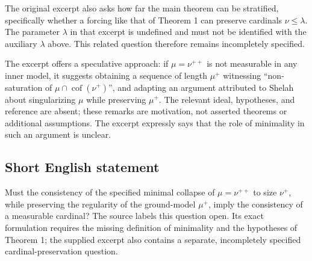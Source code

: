 \documentclass[11pt]{article}
\begin{document}
The original excerpt also asks how far the main theorem can be stratified, specifically whether a forcing like that of Theorem 1 can preserve cardinals \(\nu\leq\lambda\). The parameter \(\lambda\) in that excerpt is undefined and must not be identified with the auxiliary \(\lambda\) above. This related question therefore remains incompletely specified.

The excerpt offers a speculative approach: if \(\mu=\nu^{++}\) is not measurable in any inner model, it suggests obtaining a sequence of length \(\mu^+\) witnessing ``non-saturation of \(\mu\cap\operatorname{cof}(\nu^+)\)'', and adapting an argument attributed to Shelah about singularizing \(\mu\) while preserving \(\mu^+\). The relevant ideal, hypotheses, and reference are absent; these remarks are motivation, not asserted theorems or additional assumptions. The excerpt expressly says that the role of minimality in such an argument is unclear.
\subsection{Short English statement}
Must the consistency of the specified minimal collapse of \(\mu=\nu^{++}\) to size \(\nu^+\), while preserving the regularity of the ground-model \(\mu^+\), imply the consistency of a measurable cardinal? The source labels this question open. Its exact formulation requires the missing definition of minimality and the hypotheses of Theorem 1; the supplied excerpt also contains a separate, incompletely specified cardinal-preservation question.
\end{document}
